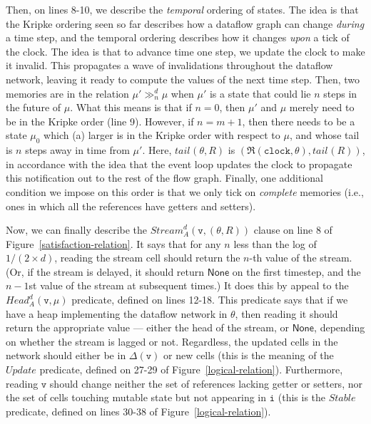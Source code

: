 \documentclass[nocopyrightspace,preprint]{sigplanconf}
\newcommand{\futurestate}[4]{{#3} \gg^{#1}_{#2} {#4}}
\newcommand{\term}[1]{\ensuremath{\mathtt{{#1}}}}
\newcommand{\Head}{\mathit{Head}}
\newcommand{\Stream}{\mathit{Stream}}
\newcommand{\Update}{\mathit{Update}}
\newcommand{\Stable}{\mathit{Stable}}
\newcommand{\None}{\mathsf{None}}
\newcommand{\tail}[2][]{\mathit{tail}^{#1}(#2)}
\begin{document}
Then, on lines 8-10, we describe the \emph{temporal} ordering of
states.  The idea is that the Kripke ordering seen so far describes
how a dataflow graph can change \emph{during} a time step, and the
temporal ordering describes how it changes \emph{upon} a tick of the
clock. The idea is that to advance time one step, we update the clock
to make it invalid. This propagates a wave of invalidations throughout
the dataflow network, leaving it ready to compute the values of the
next time step. Then, two memories are in the relation
$\futurestate{d}{n}{\mu'}{\mu}$ when $\mu'$ is a state that could lie
$n$ steps in the future of $\mu$. What this means is that if $n = 0$,
then $\mu'$ and $\mu$ merely need to be in the Kripke order (line 9).
However, if $n = m + 1$, then there needs to be a state $\mu_0$ which
(a) larger is in the Kripke order with respect to $\mu$, and whose
tail is $n$ steps away in time from $\mu'$. Here, $\tail{\theta, R}$
is $(\Re(\term{clock}, \theta), \tail{R})$, in accordance with the idea
that the event loop updates the clock to propagate this notification
out to the rest of the flow graph. Finally, one additional condition
we impose on this order is that we only tick on \emph{complete}
memories (i.e., ones in which all the references have getters and
setters). 

Now, we can finally describe the $\Stream^d_A(\term{v}, (\theta, R))$
clause on line 8 of Figure~\ref{satisfaction-relation}. It says that
for any $n$ less than the log of $1/(2 \times d)$, reading the stream
cell should return the $n$-th value of the stream. (Or, if the stream
is delayed, it should return $\None$ on the first timestep, and the
$n-1$st value of the stream at subsequent times.) It does this by
appeal to the $\Head^d_A(\term{v}, \mu)$ predicate, defined on lines
12-18. This predicate says that if we have a heap implementing the
dataflow network in $\theta$, then reading it should return the
appropriate value --- either the head of the stream, or $\None$,
depending on whether the stream is lagged or not. Regardless, the
updated cells in the network should either be in $\Delta(\term{v})$ or
new cells (this is the meaning of the $\Update$ predicate, defined on
27-29 of Figure~\ref{logical-relation}). Furthermore, reading \term{v}
should change neither the set of references lacking getter or setters,
nor the set of cells touching mutable state but not appearing in
\term{i} (this is the $\Stable$ predicate, defined on lines 30-38 of 
Figure~\ref{logical-relation}). 
\end{document}
